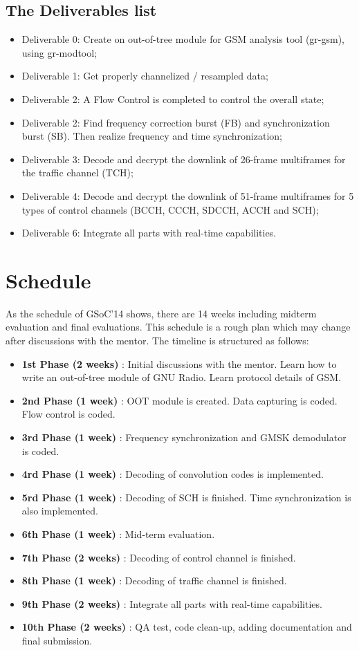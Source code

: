 \documentclass[a4paper,12pt,oneside]{article}
\begin{document}
\subsection{The Deliverables list}
\begin{itemize}
\item Deliverable 0: Create on out-of-tree module for GSM analysis tool (gr-gsm), using gr-modtool;
\item Deliverable 1: Get properly channelized / resampled data;
\item Deliverable 2: A Flow Control is completed to control the overall state;
\item Deliverable 2: Find frequency correction burst (FB) and synchronization burst (SB). Then realize frequency and time synchronization;
\item Deliverable 3: Decode and decrypt the downlink of 26-frame multiframes for the traffic channel (TCH);
\item Deliverable 4: Decode and decrypt the downlink of 51-frame multiframes for 5 types of control channels (BCCH, CCCH, SDCCH, ACCH and SCH);
\item Deliverable 6: Integrate all parts with real-time capabilities.
\end{itemize}

\section{Schedule}
As the schedule of GSoC'14 shows, there are 14 weeks including midterm evaluation and final evaluations. This schedule is a rough plan which may change after discussions with the mentor. The timeline is structured as follows:
\begin{itemize}
\item \textbf{1st Phase (2 weeks)} : Initial discussions with the mentor. Learn how to write an out-of-tree module of GNU Radio. Learn protocol details of GSM.
\item \textbf{2nd Phase (1 week)} : OOT module is created. Data capturing is coded. Flow control is coded.
\item \textbf{3rd Phase (1 week)} : Frequency synchronization and GMSK demodulator is coded.
\item \textbf{4rd Phase (1 week)} : Decoding of convolution codes is implemented.
\item \textbf{5rd Phase (1 week)} : Decoding of SCH is finished. Time synchronization is also implemented.
\item \textbf{6th Phase (1 week)} : Mid-term evaluation.
\item \textbf{7th Phase (2 weeks)} : Decoding of control channel is finished.
\item \textbf{8th Phase (1 week)} : Decoding of traffic channel is finished.
\item \textbf{9th Phase (2 weeks)} : Integrate all parts with real-time capabilities.
\item \textbf{10th Phase (2 weeks)} : QA test, code clean-up, adding documentation and final submission.

\end{itemize}
\end{document}
